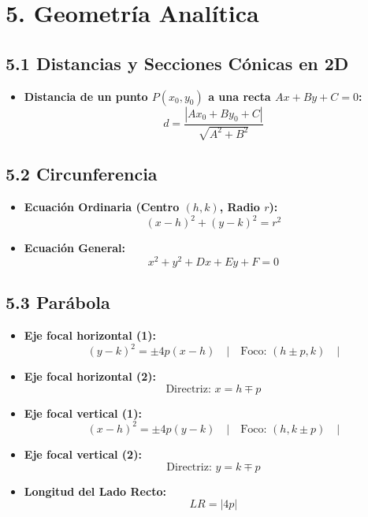 \documentclass[11pt,a4paper]{article}
\begin{document}
\section*{5. Geometría Analítica}

\subsection*{5.1 Distancias y Secciones Cónicas en 2D}

\begin{itemize}
  \item \textbf{Distancia de un punto $P(x_0, y_0)$ a una recta $Ax + By + C = 0$:}
  \[
    d = \frac{|Ax_0 + By_0 + C|}{\sqrt{A^2 + B^2}}
  \]
\end{itemize}

\subsection*{5.2 Circunferencia}

\begin{itemize}
  \item \textbf{Ecuación Ordinaria (Centro $(h, k)$, Radio $r$):}
  \[
    (x - h)^2 + (y - k)^2 = r^2
  \]
  \item \textbf{Ecuación General:}
  \[
    x^2 + y^2 + Dx + Ey + F = 0
  \]
\end{itemize}

\subsection*{5.3 Parábola}

\begin{itemize}
  \item \textbf{Eje focal horizontal (1):}
  \[
    (y - k)^2 = \pm 4p(x - h) \quad | \quad \text{Foco: } (h \pm p, k) \quad |
  \]
  \item \textbf{Eje focal horizontal (2):}
  \[
    \text{Directriz: } x = h \mp p
  \]
  \item \textbf{Eje focal vertical (1):}
  \[
    (x - h)^2 = \pm 4p(y - k) \quad | \quad \text{Foco: } (h, k \pm p) \quad |
  \]
  \item \textbf{Eje focal vertical (2):}
  \[
    \text{Directriz: } y = k \mp p
  \]
  \item \textbf{Longitud del Lado Recto:}
  \[
    LR = |4p|
  \]
\end{itemize}
\end{document}
